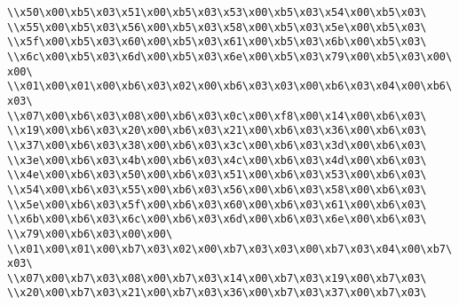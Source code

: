 \verb|\\x50\x00\xb5\x03\x51\x00\xb5\x03\x53\x00\xb5\x03\x54\x00\xb5\x03\|\newline
\verb|\\x55\x00\xb5\x03\x56\x00\xb5\x03\x58\x00\xb5\x03\x5e\x00\xb5\x03\|\newline
\verb|\\x5f\x00\xb5\x03\x60\x00\xb5\x03\x61\x00\xb5\x03\x6b\x00\xb5\x03\|\newline
\verb|\\x6c\x00\xb5\x03\x6d\x00\xb5\x03\x6e\x00\xb5\x03\x79\x00\xb5\x03\x00\x00\|\newline
\verb|\\x01\x00\x01\x00\xb6\x03\x02\x00\xb6\x03\x03\x00\xb6\x03\x04\x00\xb6\x03\|\newline
\verb|\\x07\x00\xb6\x03\x08\x00\xb6\x03\x0c\x00\xf8\x00\x14\x00\xb6\x03\|\newline
\verb|\\x19\x00\xb6\x03\x20\x00\xb6\x03\x21\x00\xb6\x03\x36\x00\xb6\x03\|\newline
\verb|\\x37\x00\xb6\x03\x38\x00\xb6\x03\x3c\x00\xb6\x03\x3d\x00\xb6\x03\|\newline
\verb|\\x3e\x00\xb6\x03\x4b\x00\xb6\x03\x4c\x00\xb6\x03\x4d\x00\xb6\x03\|\newline
\verb|\\x4e\x00\xb6\x03\x50\x00\xb6\x03\x51\x00\xb6\x03\x53\x00\xb6\x03\|\newline
\verb|\\x54\x00\xb6\x03\x55\x00\xb6\x03\x56\x00\xb6\x03\x58\x00\xb6\x03\|\newline
\verb|\\x5e\x00\xb6\x03\x5f\x00\xb6\x03\x60\x00\xb6\x03\x61\x00\xb6\x03\|\newline
\verb|\\x6b\x00\xb6\x03\x6c\x00\xb6\x03\x6d\x00\xb6\x03\x6e\x00\xb6\x03\|\newline
\verb|\\x79\x00\xb6\x03\x00\x00\|\newline
\verb|\\x01\x00\x01\x00\xb7\x03\x02\x00\xb7\x03\x03\x00\xb7\x03\x04\x00\xb7\x03\|\newline
\verb|\\x07\x00\xb7\x03\x08\x00\xb7\x03\x14\x00\xb7\x03\x19\x00\xb7\x03\|\newline
\verb|\\x20\x00\xb7\x03\x21\x00\xb7\x03\x36\x00\xb7\x03\x37\x00\xb7\x03\|\newline
